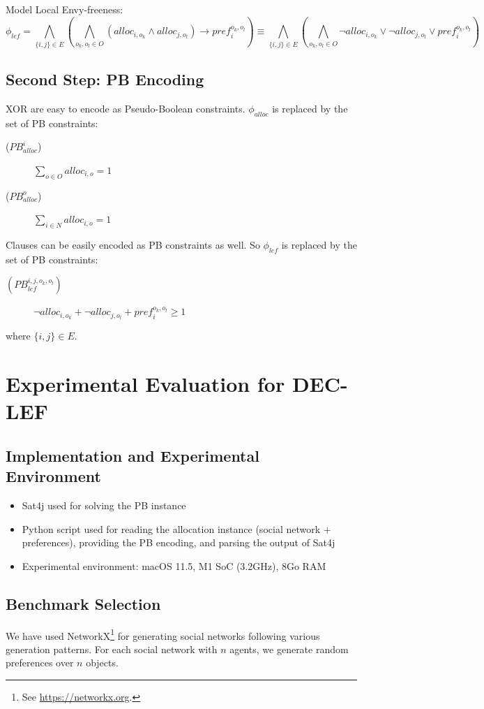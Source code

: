 \documentclass{article}
\begin{document}
Model Local Envy-freeness:
\[
\phi_{lef} = \bigwedge_{\{i,j\} \in E} (\bigwedge_{o_k,o_l \in O} (alloc_{i,o_k} \wedge alloc_{j,o_l}) \rightarrow pref_i^{o_k,o_l}) \equiv \bigwedge_{\{i,j\} \in E} (\bigwedge_{o_k,o_l \in O} \neg alloc_{i,o_k} \vee \neg alloc_{j,o_l} \vee pref_i^{o_k,o_l})
\]

\subsection{Second Step: PB Encoding}
XOR are easy to encode as Pseudo-Boolean constraints. $\phi_{alloc}$ is replaced by the set of PB constraints:
\begin{description}
	\item[($PB_{alloc}^{i}$)] $\sum_{o \in O} alloc_{i,o} = 1$
	\item[($PB_{alloc}^{o}$)] $\sum_{i \in N} alloc_{i,o} = 1$
\end{description}

Clauses can be easily encoded as PB constraints as well. So $\phi_{lef}$ is replaced by the set of PB constraints:
\begin{description}
	\item[$(PB_{lef}^{i,j,o_k,o_l})$] $\neg alloc_{i,o_k} + \neg alloc_{j,o_l} + pref_i^{o_k,o_l} \geq 1$
\end{description}
where $\{i,j\} \in E$.

\section{Experimental Evaluation for DEC-LEF}\label{section:expe-dec-lef}
\subsection{Implementation and Experimental Environment}
\begin{itemize}
	\item Sat4j \cite{BerreP10} used for solving the PB instance
	\item Python script used for reading the allocation instance (social network $+$ preferences), providing the PB encoding, and parsing the output of Sat4j
	\item Experimental environment: macOS 11.5, M1 SoC (3.2GHz), 8Go RAM
\end{itemize}

\subsection{Benchmark Selection}
We have used NetworkX\footnote{See \url{https://networkx.org}.} for generating social networks following various generation patterns. For each social network with $n$ agents, we generate random preferences over $n$ objects.
\end{document}
